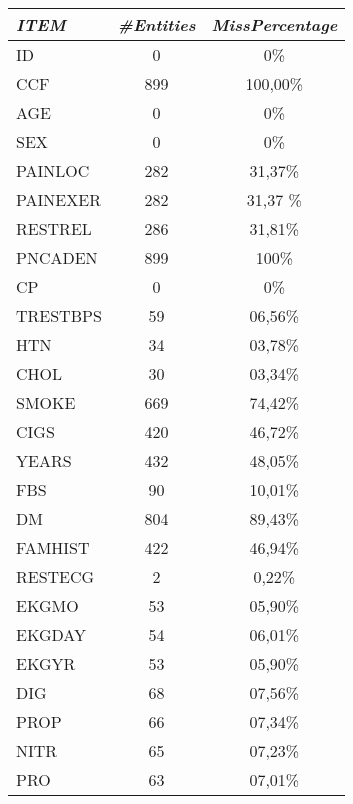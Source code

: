 \documentclass[a4paper,12pt]{article}
\begin{document}
    \begin{multicols}{2}
            \begin{tabular}{|l|c|c|} \hline

                \textit{ITEM}	& \textit{\#Entities}	& \textit{MissPercentage} \\
                \hline ID		&   0	&	0\% \\
                \hline CCF		&	899	&	100,00\% \\
                \hline AGE		&	0	&	0\% \\
                \hline SEX		&	0	&	0\% \\
                \hline PAINLOC	&	282	&	31,37\% \\
                \hline PAINEXER	&	282 & 	31,37 \% \\
                \hline RESTREL	&	286 &	31,81\% \\
                \hline PNCADEN	&	899 &	100\% \\
                \hline CP		&   0	&	0\% \\
                \hline TRESTBPS	&	59	&	06,56\% \\
                \hline HTN		& 	34	&	03,78\% \\
                \hline CHOL		& 	30	&	03,34\% \\
                \hline SMOKE	& 	669	&	74,42\% \\
                \hline CIGS		& 	420	&	46,72\% \\
                \hline YEARS	& 	432	&	48,05\% \\
                \hline FBS		& 	90	&	10,01\% \\
                \hline DM		& 	804	&	89,43\% \\
                \hline FAMHIST	&	422	& 	46,94\% \\
                \hline RESTECG	&	2	&	0,22\% \\
                \hline EKGMO	& 	53	&	05,90\% \\
                \hline EKGDAY	&	54	&	06,01\% \\
                \hline EKGYR	& 	53	&	05,90\% \\
                \hline DIG		& 	68	& 	07,56\% \\
                \hline PROP		& 	66	& 	07,34\% \\
                \hline NITR		& 	65	& 	07,23\% \\
                \hline PRO		&	63	& 	07,01\% \\ \hline



\end{tabular}
\end{multicols}
\end{document}

